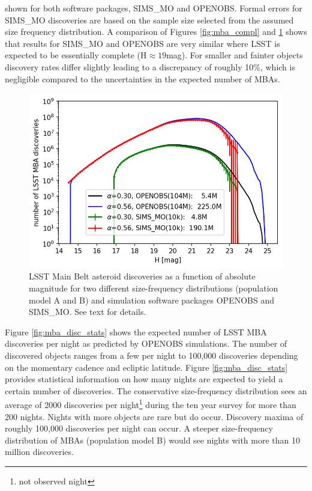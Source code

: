 shown for both software packages, SIMS\_MO and OPENOBS. Formal errors for SIMS\_MO discoveries are based on the sample size selected from the assumed size frequency distribution.
A comparison of Figures \ref{fig:mba_compl} and \ref{fig:mba_disc} shows that results for SIMS\_MO and OPENOBS are very similar where \gls{LSST} is expected to be essentially complete (H$\approx19$mag). For smaller and fainter objects discovery rates differ slightly leading to a discrepancy of roughly 10\%, which is negligible compared to the uncertainties in the expected number of MBAs.
%
\begin{figure}[tb!]
\begin{center}
\includegraphics[scale=0.9]{figs/mba_disc3.png}
\end{center}
\caption{LSST Main Belt asteroid discoveries as a function of absolute magnitude for two different size-frequency distributions (population model A and \gls{B}) and simulation software packages OPENOBS and SIMS\_MO. See text for details.}
\label{fig:mba_disc}       %
\end{figure}
%
Figure \ref{fig:mba_disc_stats} shows the expected number of \gls{LSST} \gls{MBA} discoveries per night as predicted by OPENOBS simulations. The number of discovered objects ranges from a few per night to 100,000 discoveries depending on the momentary cadence and ecliptic latitude. Figure \ref{fig:mba_disc_stats} provides statistical information on how many nights are expected to yield a certain number of discoveries. The conservative size-frequency distribution sees an average of 2000 discoveries per night\footnote{not observed night} during the ten year survey for more than 200 nights. Nights with more objects are rare but do occur. Discovery maxima of roughly 100,000 discoveries per night can occur. A steeper size-frequency distribution of MBAs (population model \gls{B}) would see nights with more than 10 million discoveries.

